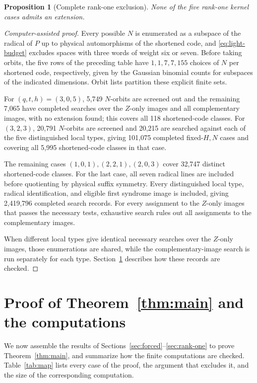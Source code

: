 \documentclass[11pt]{article}
\newtheorem{proposition}[theorem]{Proposition}
\theoremstyle{definition}
\theoremstyle{remark}
\begin{document}
\begin{proposition}[Complete rank-one exclusion]\label{prop:17-rankone}
None of the five rank-one kernel cases admits an extension.
\end{proposition}
\begin{proof}[Computer-assisted proof]
Every possible \(N\) is enumerated as a subspace of the radical of \(P\)
up to physical automorphisms of the shortened code, and
\eqref{eq:light-budget} excludes spaces with three words of weight six
or seven. Before taking orbits, the five rows of the preceding table
have \(1,1,7,7,155\) choices of \(N\) per shortened code, respectively,
given by the Gaussian binomial counts for subspaces of the indicated
dimensions. Orbit lists partition these explicit finite sets.

For \((q,t,h)=(3,0,5)\), 5,749 \(N\)-orbits are screened out and the
remaining 7,065 have completed searches over the \(Z\)-only images and
all complementary images, with no extension found; this covers all 118
shortened-code classes. For \((3,2,3)\), 20,791 \(N\)-orbits are
screened and 20,215 are searched against each of the five distinguished
local types, giving 101,075 completed fixed-\(H,N\) cases and covering
all 5,995 shortened-code classes in that case.

The remaining cases \((1,0,1),(2,2,1),(2,0,3)\) cover 32,747 distinct
shortened-code classes. For the last case, all seven radical lines are
included before quotienting by physical suffix symmetry. Every
distinguished local type, radical identification, and eligible first
syndrome image is included, giving 2,419,796 completed search records.
For every assignment to the \(Z\)-only images that passes the necessary
tests, exhaustive search rules out all assignments to the complementary
images.

When different local types give identical necessary searches over the
\(Z\)-only images, those enumerations are shared, while the
complementary-image search is run separately for each type.
Section~\ref{sec:proof} describes how these records are checked.
\end{proof}

\section{Proof of Theorem~\ref{thm:main} and the computations}\label{sec:proof}

We now assemble the results of
Sections~\ref{sec:forced}--\ref{sec:rank-one} to prove
Theorem~\ref{thm:main}, and summarize how the finite computations are
checked. Table~\ref{tab:map} lists every case of the proof, the argument
that excludes it, and the size of the corresponding computation.
\end{document}
